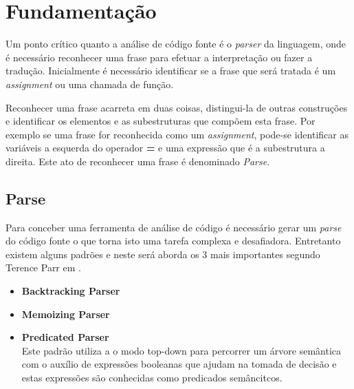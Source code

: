 %
%
\chapter{Fundamentação}
Um ponto crítico quanto a análise de código fonte é o \textit{parser} da linguagem, onde é necessário reconhecer uma frase para efetuar a interpretação ou fazer a tradução. Inicialmente é necessário identificar se a frase que será tratada é um \textit{assignment} ou uma chamada de função.
 
Reconhecer uma frase acarreta em duas coisas, distingui-la de outras construções e identificar os elementos e as subestruturas que compõem esta frase. Por exemplo se uma frase for reconhecida como um \textit{assignment}, pode-se identificar as variáveis a esquerda do operador \textbf{=} e uma expressão que é a subestrutura a direita. Este ato de reconhecer uma frase é denominado \textit{Parse}.

\section{Parse}

Para conceber uma ferramenta de análise de código é necessário gerar um \textit{parse} do código fonte o que torna isto uma tarefa complexa e desafiadora. Entretanto existem alguns padrões e neste será aborda os 3 mais importantes segundo Terence Parr em \cite{Parr:2009:LIP:1823613}.
\begin{itemize}
	\item \textbf{Backtracking Parser}\\
	
	\item \textbf{Memoizing Parser}\\
	
	\item \textbf{Predicated Parser}\\
	Este padrão utiliza a o modo top-down para percorrer um árvore semântica com o auxílio de expressões booleanas que ajudam na tomada de decisão e estas expressões são conhecidas como predicados semâncitcos.
	
\end{itemize}


